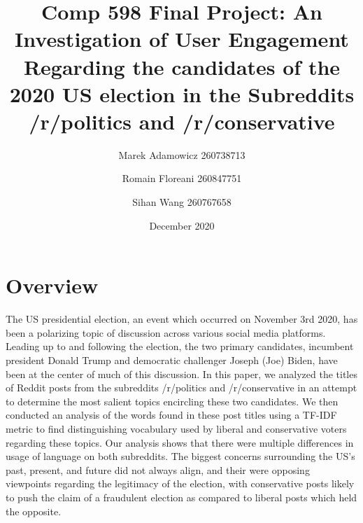 \documentclass[11pt]{article}
\title{Comp 598 Final Project: An Investigation of User Engagement Regarding the candidates of the 2020 US election in the Subreddits /r/politics and /r/conservative}
\author{Marek Adamowicz 260738713 \and Romain Floreani 260847751 \and Sihan Wang  260767658}
\date{December 2020}
\begin{document}
\maketitle


 
 


\section{Overview}

The US presidential election, an event which occurred on November 3rd 2020, has been a polarizing topic of discussion across various social media platforms. Leading up to and following the election, the two primary candidates, incumbent president Donald Trump and democratic challenger Joseph (Joe) Biden, have been at the center of much of this discussion. In this paper, we analyzed the titles of Reddit posts from the subreddits /r/politics and /r/conservative in an attempt to determine the most salient topics encircling these two candidates. We then conducted an analysis of the words found in these post titles using a TF-IDF metric to find distinguishing vocabulary used by liberal and conservative voters regarding these topics. Our analysis shows that there were multiple differences in usage of language on both subreddits. The biggest concerns surrounding the US's past, present, and future did not always align, and their were opposing viewpoints regarding the legitimacy of the election, with conservative posts likely to push the claim of a fraudulent election as compared to liberal posts which held the opposite.  
\end{document}
